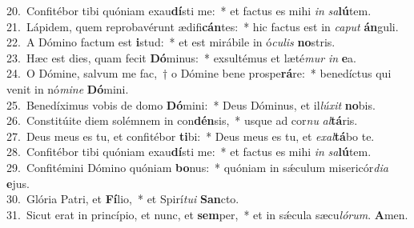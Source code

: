 {20.~}Confitébor tibi quóniam exau\textbf{dí}sti me:~* et factus es mihi \textit{in} \textit{sa}\textbf{lú}tem.\\
{21.~}Lápidem, quem reprobavérunt ædifi\textbf{cán}tes:~* hic factus est in \textit{ca}\textit{put} \textbf{án}guli.\\
{22.~}A Dómino factum est \textbf{i}stud:~* et est mirábile in ó\textit{cu}\textit{lis} \textbf{no}stris.\\
{23.~}Hæc est dies, quam fecit \textbf{Dó}minus:~* exsultémus et læté\textit{mur} \textit{in} \textbf{e}a.\\
{24.~}O Dómine, salvum me fac,~† o Dómine bene prospe\textbf{rá}re:~* benedíctus qui venit in nó\textit{mi}\textit{ne} \textbf{Dó}mini.\\
{25.~}Benedíximus vobis de domo \textbf{Dó}mini:~* Deus Dóminus, et il\textit{lú}\textit{xit} \textbf{no}bis.\\
{26.~}Constitúite diem solémnem in con\textbf{dén}sis,~* usque ad cor\textit{nu} \textit{al}\textbf{tá}ris.\\
{27.~}Deus meus es tu, et confitébor \textbf{ti}bi:~* Deus meus es tu, et \textit{e}\textit{xal}\textbf{tá}bo te.\\
{28.~}Confitébor tibi quóniam exau\textbf{dí}sti me:~* et factus es mihi \textit{in} \textit{sa}\textbf{lú}tem.\\
{29.~}Confitémini Dómino quóniam \textbf{bo}nus:~* quóniam in sǽculum misericór\textit{di}\textit{a} \textbf{e}jus.\\
{30.~}Glória Patri, et \textbf{Fí}lio,~* et Spirí\textit{tu}\textit{i} \textbf{San}cto.\\
{31.~}Sicut erat in princípio, et nunc, et \textbf{sem}per,~* et in sǽcula sæcu\textit{ló}\textit{rum}. \textbf{A}men.\\
